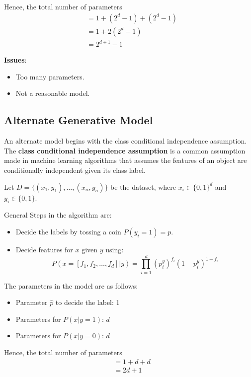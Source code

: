 \documentclass[
]{article}
\providecommand{\tightlist}{%
  \setlength{\itemsep}{0pt}\setlength{\parskip}{0pt}}
\begin{document}
Hence, the total number of parameters \begin{align*}
    &=1 + (2^d-1) + (2^d-1)\\
    &=1 + 2(2^d-1)\\
    &=2^{d+1}-1
\end{align*}

\textbf{Issues}:

\begin{itemize}
\tightlist
\item
  Too many parameters.
\item
  Not a reasonable model.
\end{itemize}

\hypertarget{alternate-generative-model}{%
\subsection{Alternate Generative
Model}\label{alternate-generative-model}}

An alternate model begins with the class conditional independence
assumption. The \textbf{class conditional independence assumption} is a
common assumption made in machine learning algorithms that assumes the
features of an object are conditionally independent given its class
label.

Let \(D=\{(x_1, y_1), \ldots, (x_n,y_n)\}\) be the dataset, where
\(x_i \in \{0, 1\}^d\) and \(y_i \in \{0, 1\}\).

General Steps in the algorithm are:

\begin{itemize}
\tightlist
\item
  Decide the labels by tossing a coin \(P(y_i=1)=p\).
\item
  Decide features for \(x\) given \(y\) using: \[
  P(x = [f_1, f_2, \ldots, f_d]|y) = \prod_{i=1}^d(p^y_i)^{f_i}(1-p^y_i)^{1-f_i}
  \]
\end{itemize}

The parameters in the model are as follows:

\begin{itemize}
\tightlist
\item
  Parameter \(\hat{p}\) to decide the label: 1
\item
  Parameters for \(P(x|y=1)\): \(d\)
\item
  Parameters for \(P(x|y=0)\): \(d\)
\end{itemize}

Hence, the total number of parameters \begin{align*}
    &=1 + d + d\\
    &=2d+1
\end{align*}
\end{document}
